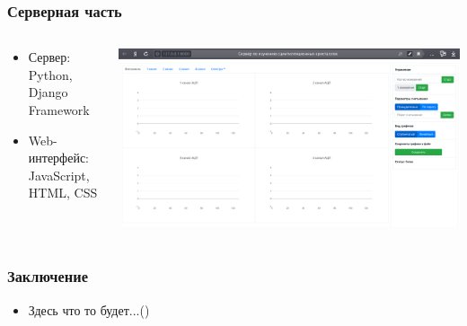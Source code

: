 \documentclass[aspectratio=169]{beamer}
\begin{document}
\begin{frame}
\frametitle{Серверная часть}
    \begin{columns}
        \begin{column}{0.25\textwidth}
            \begin{itemize}
                \item Сервер: Python, Django Framework
                \item Web-интерфейс: JavaScript, HTML, CSS
            \end{itemize}
        \end{column}
        \begin{column}{0.75\textwidth}
            \includegraphics[width=\textwidth]{server.jpg}
        \end{column}
    \end{columns}
\end{frame}

\begin{frame}
\frametitle{Заключение}
    \begin{itemize}
        \item Здесь что то будет...() 
    \end{itemize}
\end{frame}
\end{document}
